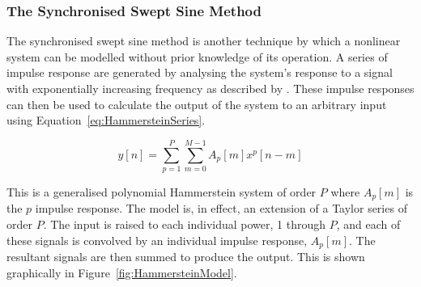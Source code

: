 		\subsubsection{The Synchronised Swept Sine Method}
			The synchronised swept sine method is another technique by which a nonlinear system can be modelled
			without prior knowledge of its operation. A series of impulse response are generated by analysing
			the system's response to a signal with exponentially increasing frequency as described by
			\citet{novak2010nonlinear}. These impulse responses can then be used to calculate the output of the
			system to an arbitrary input using Equation~\ref{eq:HammersteinSeries}.

			\begin{equation}
				y[n] = \sum_{p = 1}^{P}
					\sum_{m = 0}^{M - 1} A_{p}[m]x^{p}[n-m]
				\label{eq:HammersteinSeries}
			\end{equation}

			This is a generalised polynomial Hammerstein system of order $P$ where $A_{p}[m]$ is the
			$p$ impulse response. The model is, in effect, an extension of a Taylor series of order
			$P$. The input is raised to each individual power, 1 through $P$, and each of these signals is
			convolved by an individual impulse response, $A_{p}[m]$. The resultant signals are then summed to
			produce the output. This is shown graphically in Figure~\ref{fig:HammersteinModel}.

